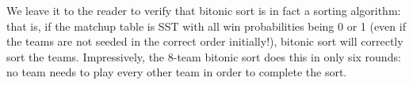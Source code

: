 {    

    We leave it to the reader to verify that bitonic sort is in fact a sorting algorithm: that is, if the matchup table is SST with all win probabilities being 0 or 1 (even if the teams are not seeded in the correct order initially!), bitonic sort will correctly sort the teams. Impressively, the 8-team bitonic sort does this in only six rounds: no team needs to play every other team in order to complete the sort.
}